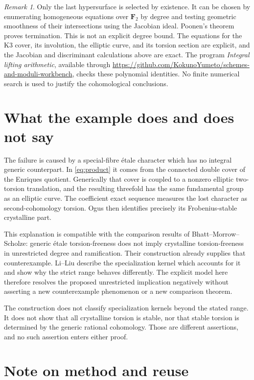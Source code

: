\documentclass[11pt]{article}
\newcommand{\workbenchurl}{https://github.com/KokunoYumeto/schemes-and-moduli-workbench}
\newcommand{\FF}{\mathbf F}\newcommand{\PP}{\mathbf P}
\theoremstyle{definition}\newtheorem{definition}[theorem]{Definition}
\theoremstyle{remark}\newtheorem{remark}[theorem]{Remark}
\begin{document}
\begin{remark}\label{rem:effective}
Only the last hypersurface is selected by existence. It can be chosen by enumerating homogeneous equations over $\FF_2$ by degree and testing geometric smoothness of their intersections using the Jacobian ideal. Poonen's theorem proves termination. This is not an explicit degree bound. The equations for the K3 cover, its involution, the elliptic curve, and its torsion section are explicit, and the Jacobian and discriminant calculations above are exact. The program \emph{Integral lifting arithmetic}, available through \url{\workbenchurl}, checks these polynomial identities. No finite numerical search is used to justify the cohomological conclusions.
\end{remark}

\section{What the example does and does not say}

The failure is caused by a special-fibre \'etale character which has no integral generic counterpart. In \eqref{eq:product} it comes from the connected double cover of the Enriques quotient. Generically that cover is coupled to a nonzero elliptic two-torsion translation, and the resulting threefold has the same fundamental group as an elliptic curve. The coefficient exact sequence measures the lost character as second-cohomology torsion. Ogus then identifies precisely its Frobenius-stable crystalline part.

This explanation is compatible with the comparison results of Bhatt--Morrow--Scholze: generic \'etale torsion-freeness does not imply crystalline torsion-freeness in unrestricted degree and ramification. Their construction already supplies that counterexample. Li--Liu describe the specialization kernel which accounts for it and show why the strict range behaves differently. The explicit model here therefore resolves the proposed unrestricted implication negatively without asserting a new counterexample phenomenon or a new comparison theorem.

The construction does not classify specialization kernels beyond the stated range. It does not show that all crystalline torsion is stable, nor that stable torsion is determined by the generic rational cohomology. Those are different assertions, and no such assertion enters either proof.

\section*{Note on method and reuse}
\end{document}
